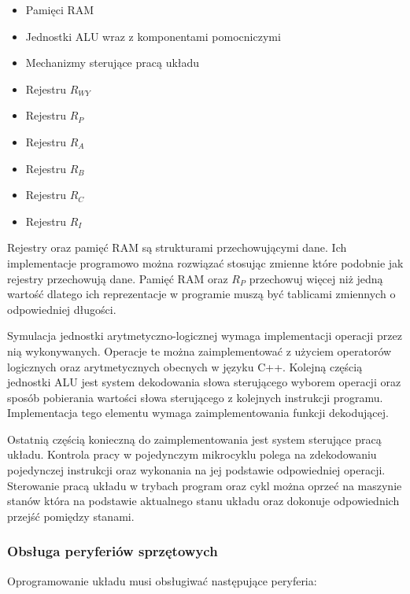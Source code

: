 \documentclass[../main.tex]{subfiles}
\begin{document}
    \begin{itemize}
        \item Pamięci RAM
        \item Jednostki ALU wraz z komponentami pomocniczymi
        \item Mechanizmy sterujące pracą układu
        \item Rejestru $R_{WY}$
        \item Rejestru $R_P$
        \item Rejestru $R_A$
        \item Rejestru $R_B$
        \item Rejestru $R_C$
        \item Rejestru $R_I$
    \end{itemize}

    Rejestry oraz pamięć RAM są strukturami przechowującymi dane. Ich implementacje programowo można rozwiązać stosując zmienne które
    podobnie jak rejestry przechowują dane. Pamięć RAM oraz $R_P$ przechowuj więcej niż jedną wartość dlatego ich reprezentacje w 
    programie muszą być tablicami zmiennych o odpowiedniej długości. 
    \par
    Symulacja jednostki arytmetyczno-logicznej wymaga implementacji
    operacji przez nią wykonywanych. Operacje te można zaimplementować z użyciem operatorów logicznych oraz arytmetycznych
    obecnych w języku C++. Kolejną częścią jednostki ALU jest system dekodowania słowa sterującego wyborem operacji oraz sposób pobierania
    wartości słowa sterującego z kolejnych instrukcji programu. Implementacja tego elementu wymaga zaimplementowania funkcji dekodującej.
    \par
    Ostatnią częścią konieczną do zaimplementowania jest system sterujące pracą układu. Kontrola pracy w pojedynczym mikrocyklu polega
    na zdekodowaniu pojedynczej instrukcji oraz wykonania na jej podstawie odpowiedniej operacji. Sterowanie pracą układu w trybach program
    oraz cykl można oprzeć na maszynie stanów która na podstawie aktualnego stanu układu oraz dokonuje odpowiednich przejść pomiędzy stanami.

    \subsubsection{Obsługa peryferiów sprzętowych}

    Oprogramowanie układu musi obsługiwać następujące peryferia:
\end{document}
